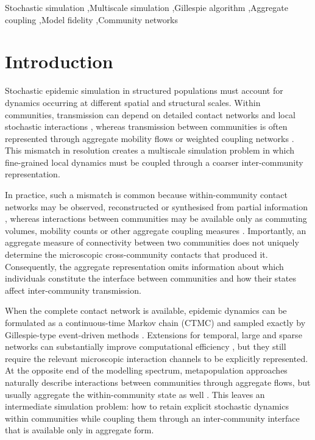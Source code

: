 \documentclass[a4paper,fleqn]{cas-sc}
\begin{document}
\begin{keywords}
Stochastic simulation \sep Multiscale simulation \sep Gillespie algorithm \sep Aggregate coupling \sep Model fidelity \sep Community networks
\end{keywords}

\maketitle

\section{Introduction}
\label{sec:introduction}

Stochastic epidemic simulation in structured populations must account for dynamics occurring at different spatial and structural scales. Within communities, transmission can depend on detailed contact networks and local stochastic interactions \citep{keeling2005,pastorsatorras2015,kiss2017}, whereas transmission between communities is often represented through aggregate mobility flows or weighted coupling networks \citep{balcan2009,barbosa2018human}. This mismatch in resolution creates a multiscale simulation problem in which fine-grained local dynamics must be coupled through a coarser inter-community representation.

In practice, such a mismatch is common because within-community contact networks may be observed, reconstructed or synthesised from partial information \citep{eubank2004,danon2011}, whereas interactions between communities may be available only as commuting volumes, mobility counts or other aggregate coupling measures \citep{barbosa2018human,chang2021}. Importantly, an aggregate measure of connectivity between two communities does not uniquely determine the microscopic cross-community contacts that produced it. Consequently, the aggregate representation omits information about which individuals constitute the interface between communities and how their states affect inter-community transmission.

When the complete contact network is available, epidemic dynamics can be formulated as a continuous-time Markov chain (CTMC) and sampled exactly by Gillespie-type event-driven methods \citep{gillespie1977exact,gibson2000}. Extensions for temporal, large and sparse networks can substantially improve computational efficiency \citep{vestergaard2015,kuryliak2025simulating}, but they still require the relevant microscopic interaction channels to be explicitly represented. At the opposite end of the modelling spectrum, metapopulation approaches naturally describe interactions between communities through aggregate flows, but usually aggregate the within-community state as well \citep{colizza2007reaction,colizza2008,balcan2010modeling,ajelli2010}. This leaves an intermediate simulation problem: how to retain explicit stochastic dynamics within communities while coupling them through an inter-community interface that is available only in aggregate form.
\end{document}
